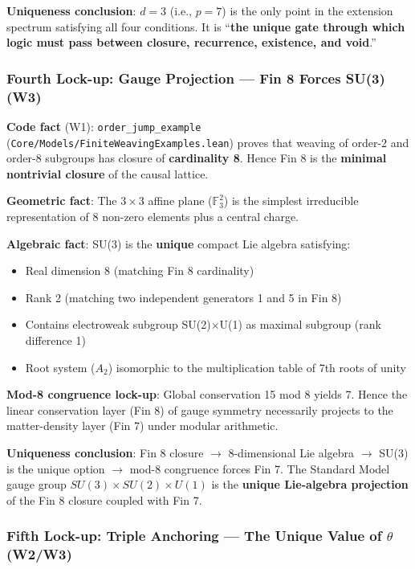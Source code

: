 \documentclass[aps,prd,twocolumn,nofootinbib,floatfix]{revtex4-2}
\begin{document}
\textbf{Uniqueness conclusion}: $d=3$ (i.e., $p=7$) is the only point in the extension spectrum satisfying all four conditions. It is ``\textbf{the unique gate through which logic must pass between closure, recurrence, existence, and void}.''

\subsubsection*{Fourth Lock-up: Gauge Projection --- Fin 8 Forces SU(3) (W3)}

\textbf{Code fact} (W1): \texttt{order\_jump\_example} (\texttt{Core/Models/FiniteWeavingExamples.lean}) proves that weaving of order-2 and order-8 subgroups has closure of \textbf{cardinality 8}. Hence Fin 8 is the \textbf{minimal nontrivial closure} of the causal lattice.

\textbf{Geometric fact}: The $3\times 3$ affine plane ($\mathbb{F}_3^2$) is the simplest irreducible representation of 8 non-zero elements plus a central charge.

\textbf{Algebraic fact}: SU(3) is the \textbf{unique} compact Lie algebra satisfying:
\begin{itemize}
    \item Real dimension 8 (matching Fin 8 cardinality)
    \item Rank 2 (matching two independent generators 1 and 5 in Fin 8)
    \item Contains electroweak subgroup SU(2)$\times$U(1) as maximal subgroup (rank difference 1)
    \item Root system ($A_2$) isomorphic to the multiplication table of 7th roots of unity
\end{itemize}

\textbf{Mod-8 congruence lock-up}: Global conservation 15 mod 8 yields 7. Hence the linear conservation layer (Fin 8) of gauge symmetry necessarily projects to the matter-density layer (Fin 7) under modular arithmetic.

\textbf{Uniqueness conclusion}: Fin 8 closure $\to$ 8-dimensional Lie algebra $\to$ SU(3) is the unique option $\to$ mod-8 congruence forces Fin 7. The Standard Model gauge group $SU(3)\times SU(2)\times U(1)$ is the \textbf{unique Lie-algebra projection} of the Fin 8 closure coupled with Fin 7.

\subsubsection*{Fifth Lock-up: Triple Anchoring --- The Unique Value of $\theta$ (W2/W3)}
\end{document}
